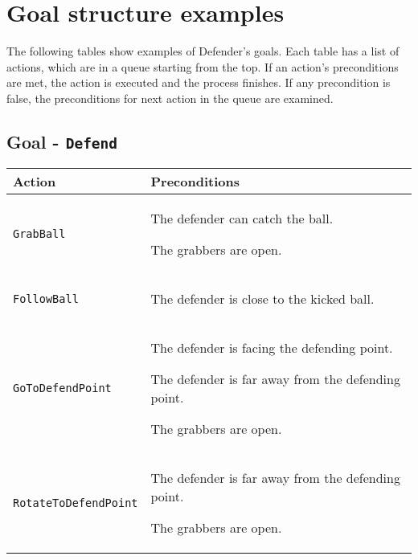 \section{Goal structure examples} \label{goalstructure}

The following tables show examples of Defender's goals. Each table has a list
of actions, which are in a queue starting from the top. If an action's
preconditions are met, the action is executed and the process finishes. If any
precondition is false, the preconditions for next action in the queue are
examined.

\subsection{Goal - \texttt{Defend}}

\begin{center}

\renewcommand{\arraystretch}{1.5}
\begin{tabular}{ | >{\centering\arraybackslash}m{42mm} | >{\centering\arraybackslash}p{110mm} | }
\hline
\textbf{Action} & \textbf{Preconditions} \\ \hline
\texttt{GrabBall} &
\begin{compactitem}
\item The defender can catch the ball.
\item The grabbers are open.
\end{compactitem}  \\ \hline

\texttt{FollowBall} &
\begin{compactitem}
\item The defender is close to the kicked ball.
\end{compactitem}  \\ \hline

\texttt{GoToDefendPoint} &
\begin{compactitem}
\item The defender is facing the defending point.
\item The defender is far away from the defending point.
\item The grabbers are open.
\end{compactitem}  \\ \hline

\texttt{RotateToDefendPoint} &
\begin{compactitem}
\item The defender is far away from the defending point.
\item The grabbers are open.
\end{compactitem}  \\ \hline


\end{tabular}
\end{center}
